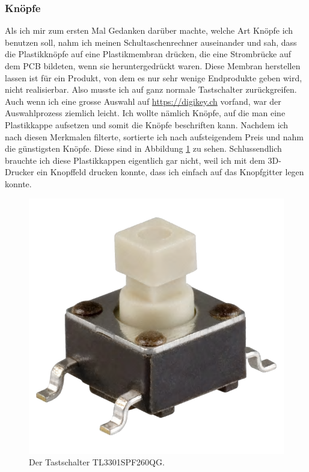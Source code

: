 \documentclass[12pt, a4paper]{report}
\begin{document}
\subsubsection{Knöpfe}
Als ich mir zum ersten Mal Gedanken darüber machte, welche Art Knöpfe ich benutzen soll, nahm ich meinen Schultaschenrechner auseinander und sah, dass die Plastikknöpfe auf eine Plastikmembran drücken, die eine Strombrücke auf dem PCB bildeten, wenn sie heruntergedrückt waren. Diese Membran herstellen lassen ist für ein Produkt, von dem es nur sehr wenige Endprodukte geben wird, nicht realisierbar. Also musste ich auf ganz normale Tastschalter zurückgreifen.
\\[\medskipamount]
Auch wenn ich eine grosse Auswahl auf \url{https://digikey.ch} vorfand, war der Auswahlprozess ziemlich leicht. Ich wollte nämlich Knöpfe, auf die man eine Plastikkappe aufsetzen und somit die Knöpfe beschriften kann. Nachdem ich nach diesen Merkmalen filterte, sortierte ich nach aufsteigendem Preis und nahm die günstigsten Knöpfe. Diese sind in Abbildung \ref{fig:button_image} zu sehen. Schlussendlich brauchte ich diese Plastikkappen eigentlich gar nicht, weil ich mit dem 3D-Drucker ein Knopffeld drucken konnte, dass ich einfach auf das Knopfgitter legen konnte.
\begin{figure}[H]
\centering
\includegraphics[width=0.2\linewidth]{assets/TL3301SPF260QG.png}
\caption{Der Tastschalter TL3301SPF260QG.}
\label{fig:button_image}
\end{figure}
\end{document}
